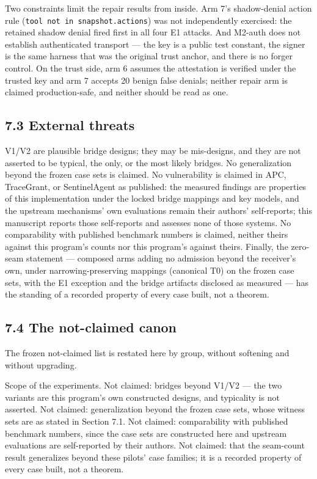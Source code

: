 \documentclass[
  10pt,
]{article}
\newcounter{none} %
\let\origtexttt\texttt
\renewcommand{\texttt}[1]{{\upshape\origtexttt{#1}}}
\renewcommand{\_}{\origunderscore\allowbreak}
\begin{document}
Two constraints limit the repair results from inside. Arm 7's
shadow-denial action rule (\texttt{tool\ not\ in\ snapshot.actions}) was
not independently exercised: the retained shadow denial fired first in
all four E1 attacks. And M2-auth does not establish authenticated
transport --- the key is a public test constant, the signer is the same
harness that was the original trust anchor, and there is no forger
control. On the trust side, arm 6 assumes the attestation is verified
under the trusted key and arm 7 accepts 20 benign false denials; neither
repair arm is claimed production-safe, and neither should be read as
one.

\subsection{7.3 External threats}\label{external-threats}

V1/V2 are plausible bridge designs; they may be mis-designs, and they
are not asserted to be typical, the only, or the most likely bridges. No
generalization beyond the frozen case sets is claimed. No vulnerability
is claimed in APC, TraceGrant, or SentinelAgent as published: the
measured findings are properties of this implementation under the locked
bridge mappings and key models, and the upstream mechanisms' own
evaluations remain their authors' self-reports; this manuscript reports
those self-reports and assesses none of those systems. No comparability
with published benchmark numbers is claimed, neither theirs against this
program's counts nor this program's against theirs. Finally, the
zero-seam statement --- composed arms adding no admission beyond the
receiver's own, under narrowing-preserving mappings (canonical T0) on
the frozen case sets, with the E1 exception and the bridge artifacts
disclosed as measured --- has the standing of a recorded property of
every case built, not a theorem.

\subsection{7.4 The not-claimed canon}\label{the-not-claimed-canon}

The frozen not-claimed list is restated here by group, without softening
and without upgrading.

Scope of the experiments. Not claimed: bridges beyond V1/V2 --- the two
variants are this program's own constructed designs, and typicality is
not asserted. Not claimed: generalization beyond the frozen case sets,
whose witness sets are as stated in Section 7.1. Not claimed:
comparability with published benchmark numbers, since the case sets are
constructed here and upstream evaluations are self-reported by their
authors. Not claimed: that the seam-count result generalizes beyond
these pilots' case families; it is a recorded property of every case
built, not a theorem.
\end{document}
